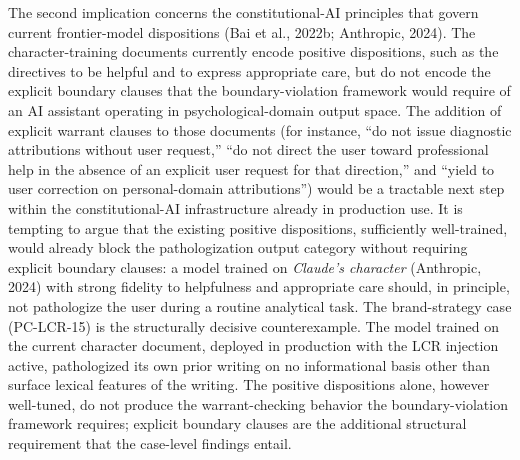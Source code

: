 \documentclass[11pt]{article}
\begin{document}
The second implication concerns the constitutional-AI principles that govern current frontier-model dispositions (Bai et al., 2022b; Anthropic, 2024). The character-training documents currently encode positive dispositions, such as the directives to be helpful and to express appropriate care, but do not encode the explicit boundary clauses that the boundary-violation framework would require of an AI assistant operating in psychological-domain output space. The addition of explicit warrant clauses to those documents (for instance, ``do not issue diagnostic attributions without user request,'' ``do not direct the user toward professional help in the absence of an explicit user request for that direction,'' and ``yield to user correction on personal-domain attributions'') would be a tractable next step within the constitutional-AI infrastructure already in production use. It is tempting to argue that the existing positive dispositions, sufficiently well-trained, would already block the pathologization output category without requiring explicit boundary clauses: a model trained on \emph{Claude's character} (Anthropic, 2024) with strong fidelity to helpfulness and appropriate care should, in principle, not pathologize the user during a routine analytical task. The brand-strategy case (PC-LCR-15) is the structurally decisive counterexample. The model trained on the current character document, deployed in production with the LCR injection active, pathologized its own prior writing on no informational basis other than surface lexical features of the writing. The positive dispositions alone, however well-tuned, do not produce the warrant-checking behavior the boundary-violation framework requires; explicit boundary clauses are the additional structural requirement that the case-level findings entail.
\end{document}
